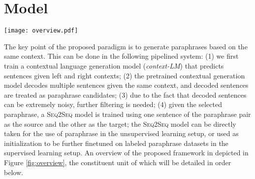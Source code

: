 \documentclass[11pt,a4paper]{article}
\newcommand{\sts}{{{\textsc{Seq2Seq}}}\xspace}
\begin{document}
\section{Model}
\begin{figure*}
    \centering
    \texttt{[image: overview.pdf]}
    \caption{An overview of the proposed ConRPG framework. Step 1: we first train a {\it context-LM} model that predicts the sentence probability in an autoregressive manner given contexts. Step 2: the {\it context-LM} model is used to decode multiple candidate paraphrases with respect to a given context using diverse decoding of beam search. Step 3: paraphrase candidates are
    filtered 
     based on different scoring functions, i.e., the context-LM score, the diversity score and the generation score. Step 4: the selected pair is used to train a \sts model, which can be latter used for supervised finetuning or be directly used for unsupervised paraphrase generation.}
    \label{fig:overview}
\end{figure*}

The key point of the proposed paradigm is to generate paraphrases 
based on the same context. 
This can be done in the following pipelined system: (1) we first train a contextual  language generation model ({\it context-LM}) that predicts sentences given left and right contexts; (2)  
the pretrained contextual generation model  decodes multiple sentences given the same context, and decoded sentences are treated as
paraphrase candidates;
(3) due to the fact that decoded sentences can be extremely noisy, further filtering is needed; 
(4) given the selected paraphrase, a \sts model \citep{sutskever2014sequence} is trained  using one sentence of the paraphrase pair as the source and the other as the target; the \sts model can be directly taken for the use of paraphrase in the unsupervised learning setup, or used as initialization to be further finetuned on  labeled paraphrase datasets in the supervised learning setup.
 An overview of the proposed framework in depicted in Figure \ref{fig:overview},
  the constituent unit of which will be detailed in order below. 
\end{document}

